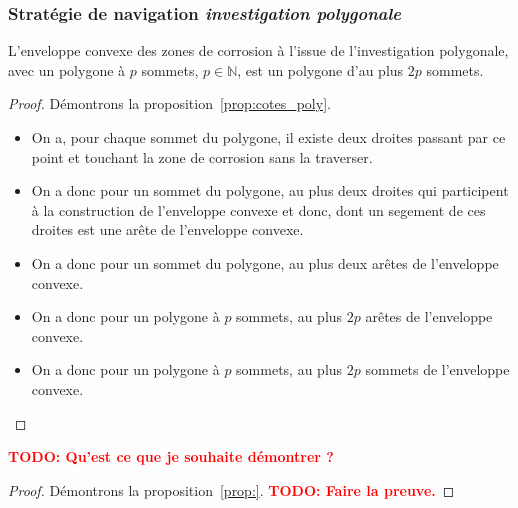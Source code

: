 \documentclass[francais,RandD]{rapportPFE}
\newcommand{\TODO}[1]{\textcolor{red}{\textbf{TODO: #1}}}
\begin{document}
			\subsubsection*{Stratégie de navigation \textit{investigation polygonale}}
				\begin{Proposition}
					L'enveloppe convexe des zones de corrosion à l'issue de l'investigation polygonale, avec un polygone à $p$ sommets, $p \in \mathbb{N}$, est un polygone d'au plus $2p$ sommets.
					\label{prop:cotes_poly}
				\end{Proposition}
				\begin{proof}
					Démontrons la proposition~\ref{prop:cotes_poly}.
					\begin{itemize}
						\item On a, pour chaque sommet du polygone, il existe deux droites passant par ce point et touchant la zone de corrosion sans la traverser.
						\item On a donc pour un sommet du polygone, au plus deux droites qui participent à la construction de l'enveloppe convexe et donc, dont un segement de ces droites est une arête de l'enveloppe convexe.
						\item On a donc pour un sommet du polygone, au plus deux arêtes de l'enveloppe convexe.
						\item On a donc pour un polygone à $p$ sommets, au plus $2p$ arêtes de l'enveloppe convexe.
						\item On a donc pour un polygone à $p$ sommets, au plus $2p$ sommets de l'enveloppe convexe.
					\end{itemize}
				\end{proof}

				\begin{Proposition}
					\TODO{Qu'est ce que je souhaite démontrer ?}
					\label{prop:}
				\end{Proposition}
				\begin{proof}
					Démontrons la proposition~\ref{prop:}.
					\TODO{Faire la preuve.}
				\end{proof}
\end{document}
